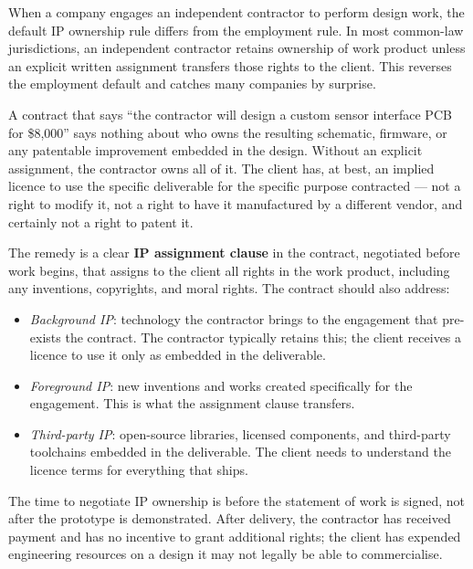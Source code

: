 When a company engages an
independent contractor to perform design work, the default IP ownership rule
differs from the employment rule.
In most common-law jurisdictions, an independent contractor retains ownership of
work product unless an explicit written assignment transfers those rights to the
client.
This reverses the employment default and catches many companies by surprise.

A contract that says ``the contractor will design a custom sensor interface PCB
for \$8,000'' says nothing about who owns the resulting schematic, firmware, or
any patentable improvement embedded in the design.
Without an explicit assignment, the contractor owns all of it.
The client has, at best, an implied licence to use the specific deliverable for
the specific purpose contracted --- not a right to modify it, not a right to have
it manufactured by a different vendor, and certainly not a right to patent it.

The remedy is a clear \textbf{IP assignment clause}
in the contract, negotiated before work begins, that assigns to the client all
rights in the work product, including any inventions, copyrights, and moral
rights.
The contract should also address:
\begin{itemize}
  \item \emph{Background IP}: technology the contractor brings to the engagement
        that pre-exists the contract.
        The contractor typically retains this; the client receives a licence to
        use it only as embedded in the deliverable.
  \item \emph{Foreground IP}: new inventions and works created specifically for
        the engagement.
        This is what the assignment clause transfers.
  \item \emph{Third-party IP}: open-source libraries, licensed components, and
        third-party toolchains embedded in the deliverable.
        The client needs to understand the licence terms for everything that ships.
\end{itemize}

The time to negotiate IP ownership is before the statement of work is signed, not
after the prototype is demonstrated.
After delivery, the contractor has received payment and has no incentive to grant
additional rights; the client has expended engineering resources on a design it
may not legally be able to commercialise.

